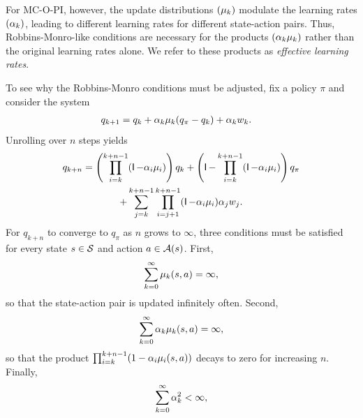 


\vspace{-0.5cm}

For MC-O-PI, however, the update distributions $(\mu_k)$ modulate the learning rates $(\alpha_k)$, leading to different learning rates for different state-action pairs.
Thus, Robbins-Monro-like conditions are necessary for the products $(\alpha_k \mu_k)$ rather than the original learning rates alone.
We refer to these products as \textit{effective learning rates}.

To see why the Robbins-Monro conditions must be adjusted, fix a policy $\pi$ and consider the system
\begin{align}
\label{eq: single system}
    q_{k+1}
    &= q_k + \alpha_k \mu_k (q_\pi - q_k) + \alpha_k w_k .
\end{align}
Unrolling over $n$ steps yields
\begin{multline*}
    q_{k+n}
    = \left( \prod_{i=k}^{k+n-1} (\operatorname{\mathsf{I}} -\alpha_i \mu_i) \right) q_k 
    + \left( \operatorname{\mathsf{I}} - \prod_{i=k}^{k+n-1} (\operatorname{\mathsf{I}} -\alpha_i \mu_i) \right) q_\pi
    \\
    + \sum_{j=k}^{k+n-1} \prod_{i=j+1}^{k+n-1} (\operatorname{\mathsf{I}} -\alpha_i \mu_i) \alpha_j w_j .
\end{multline*}
For $q_{k+n}$ to converge to $q_\pi$ as $n$ grows to $\infty$, three conditions must be satisfied for every state $s \in \mathcal{S}$ and action $a \in \mathcal{A}(s)$.
First,
\begin{align}
\label{eq: condition infinite visits}
    \sum_{k=0}^{\infty} \mu_k(s,a) = \infty ,
\end{align}
so that the state-action pair is updated infinitely often.
Second, 
\begin{align}
    \label{eq: condition infinite effective learning rate}
    \sum_{k=0}^{\infty} \alpha_k \mu_k(s,a) = \infty ,
\end{align}
so that the product $\prod_{i=k}^{k+n-1} (1 - \alpha_i \mu_i(s,a))$ decays to zero for increasing $n$.
Finally,
\begin{align}
    \label{eq: summable learning rates outside def}
    \sum_{k=0}^\infty \alpha_k^2 < \infty ,
\end{align}
